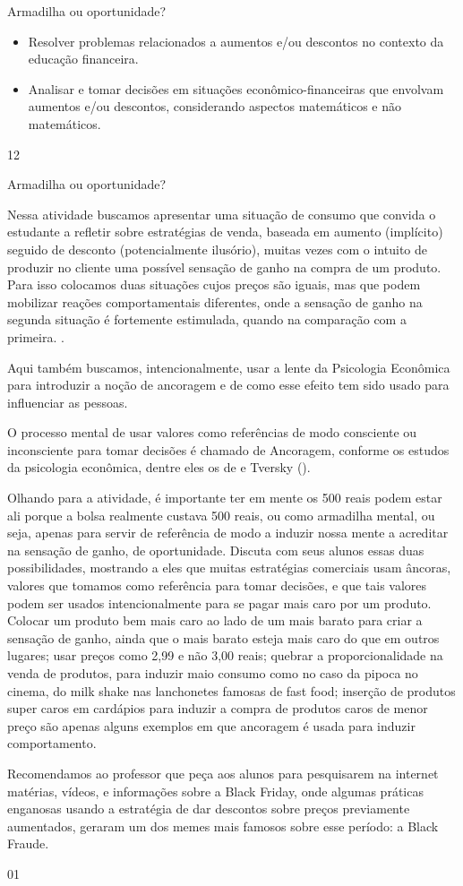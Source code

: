 \clearpage
\def\currentcolor{session2}
\begin{objectives}{Armadilha ou oportunidade?}
{
\begin{itemize}
\item Resolver problemas relacionados a aumentos e/ou descontos no contexto da educação financeira.
\item Analisar e tomar decisões em situações econômico-financeiras que envolvam aumentos e/ou descontos, considerando aspectos matemáticos e não matemáticos.
\end{itemize}
}{1}{2}
\end{objectives}
\begin{sugestions}{Armadilha ou oportunidade?}
{
Nessa atividade buscamos apresentar uma situação de consumo que convida o estudante a refletir sobre estratégias de venda, baseada em aumento (implícito) seguido de desconto (potencialmente ilusório), muitas vezes com o intuito de produzir no cliente uma possível sensação de ganho na compra de um produto. Para isso colocamos duas situações cujos preços são iguais, mas que podem mobilizar reações comportamentais diferentes, onde a sensação de ganho na segunda situação é fortemente estimulada, quando na comparação com a primeira. \citep{kahneman2012}.

Aqui também buscamos, intencionalmente, usar a lente da Psicologia Econômica para introduzir a noção de ancoragem e de como esse efeito tem sido usado para influenciar as pessoas. 

O processo mental de usar valores como referências de modo consciente ou inconsciente para tomar decisões é chamado de Ancoragem, conforme os estudos da psicologia econômica, dentre eles os de \citeauthor{kahneman2012} e Tversky (\citeyear{kahneman2012}).

Olhando para a atividade, é importante ter em mente os 500 reais podem estar ali porque a bolsa realmente custava 500 reais, ou como armadilha mental, ou seja, apenas para servir de referência de modo a induzir nossa mente a acreditar na sensação de ganho, de oportunidade. 
Discuta com seus alunos essas duas possibilidades, mostrando a eles que muitas estratégias comerciais usam âncoras, valores que tomamos como referência para tomar decisões, e que tais valores podem ser usados intencionalmente para se pagar mais caro por um produto. Colocar um produto bem mais caro ao lado de um mais barato para criar a sensação de ganho, ainda que o mais barato esteja mais caro do que em outros lugares; usar preços como 2,99 e não 3{,}00 reais; quebrar a proporcionalidade na venda de produtos, para induzir maio consumo como no caso da pipoca no cinema, do milk shake nas lanchonetes famosas de fast food; inserção de produtos super caros em cardápios para induzir a compra de produtos caros de menor preço são apenas alguns exemplos em que ancoragem é usada para induzir comportamento. 

Recomendamos ao professor que peça aos alunos para pesquisarem na internet matérias, vídeos, e informações sobre a Black Friday, onde algumas práticas enganosas usando a estratégia de dar descontos sobre preços previamente aumentados, geraram um dos memes mais famosos sobre esse período: a Black Fraude. 

}{0}{1}
\end{sugestions}
